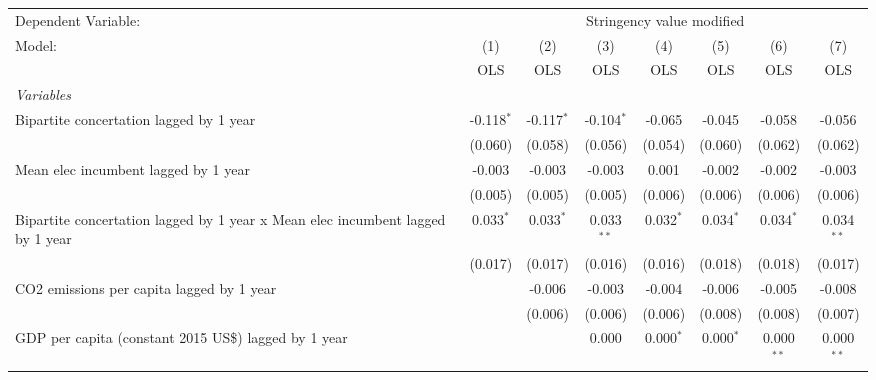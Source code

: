 
\begingroup
\centering
\begin{tabular}{lccccccc}
   \toprule
   Dependent Variable: & \multicolumn{7}{c}{Stringency value modified}\\
   Model:                                                                         & (1)          & (2)          & (3)          & (4)         & (5)         & (6)          & (7)\\  
                                                                                  &  OLS         & OLS          & OLS          & OLS         & OLS         & OLS          & OLS\\  
   \midrule
   \emph{Variables}\\
   Bipartite concertation lagged by 1 year                                        & -0.118$^{*}$ & -0.117$^{*}$ & -0.104$^{*}$ & -0.065      & -0.045      & -0.058       & -0.056\\   
                                                                                  & (0.060)      & (0.058)      & (0.056)      & (0.054)     & (0.060)     & (0.062)      & (0.062)\\   
   Mean elec incumbent lagged by 1 year                                           & -0.003       & -0.003       & -0.003       & 0.001       & -0.002      & -0.002       & -0.003\\   
                                                                                  & (0.005)      & (0.005)      & (0.005)      & (0.006)     & (0.006)     & (0.006)      & (0.006)\\   
   Bipartite concertation lagged by 1 year x Mean elec incumbent lagged by 1 year & 0.033$^{*}$  & 0.033$^{*}$  & 0.033$^{**}$ & 0.032$^{*}$ & 0.034$^{*}$ & 0.034$^{*}$  & 0.034$^{**}$\\   
                                                                                  & (0.017)      & (0.017)      & (0.016)      & (0.016)     & (0.018)     & (0.018)      & (0.017)\\   
   CO2 emissions per capita lagged by 1 year                                      &              & -0.006       & -0.003       & -0.004      & -0.006      & -0.005       & -0.008\\   
                                                                                  &              & (0.006)      & (0.006)      & (0.006)     & (0.008)     & (0.008)      & (0.007)\\   
   GDP per capita (constant 2015 US\$) lagged by 1 year                           &              &              & 0.000        & 0.000$^{*}$ & 0.000$^{*}$ & 0.000$^{**}$ & 0.000$^{**}$\\   

\end{tabular}
